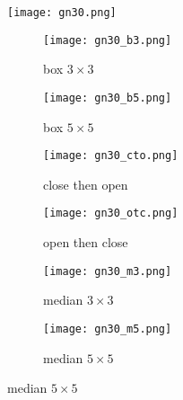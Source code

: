 \documentclass{article}
\begin{document}
\begin{figure}[ht]
    \centering
    \texttt{[image: gn30.png]}
    \caption{gaussian noise 30}
    \label{fig:top_image}

    \begin{subfigure}{0.3\textwidth}
        \texttt{[image: gn30\_b3.png]}
        \caption{box $3 \times 3$}
        \label{fig:sub1}
    \end{subfigure}
    \begin{subfigure}{0.3\textwidth}
        \texttt{[image: gn30\_b5.png]}
        \caption{box $5 \times 5$}
        \label{fig:sub2}
    \end{subfigure}

    \begin{subfigure}{0.3\textwidth}
        \texttt{[image: gn30\_cto.png]}
        \caption{close then open}
        \label{fig:sub3}
    \end{subfigure}%
    \begin{subfigure}{0.3\textwidth}
        \texttt{[image: gn30\_otc.png]}
        \caption{open then close}
        \label{fig:sub4}
    \end{subfigure}

    \begin{subfigure}{0.3\textwidth}
        \texttt{[image: gn30\_m3.png]}
        \caption{median $3 \times 3$}
        \label{fig:sub5}
    \end{subfigure}%
    \begin{subfigure}{0.3\textwidth}
        \texttt{[image: gn30\_m5.png]}
        \caption{median $5 \times 5$}
        \label{fig:sub6}
    \end{subfigure}

\end{figure}
\newpage
\end{document}
